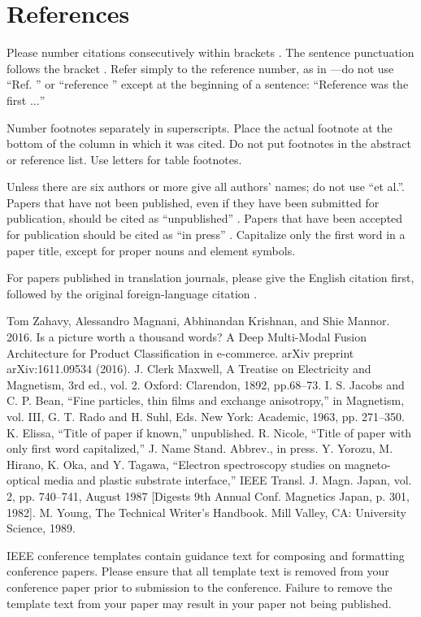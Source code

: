 \documentclass[conference]{IEEEtran}
\begin{document}
\section*{References}

Please number citations consecutively within brackets \cite{b1}. The 
sentence punctuation follows the bracket \cite{b2}. Refer simply to the reference 
number, as in \cite{b3}---do not use ``Ref. \cite{b3}'' or ``reference \cite{b3}'' except at 
the beginning of a sentence: ``Reference \cite{b3} was the first $\ldots$''

Number footnotes separately in superscripts. Place the actual footnote at 
the bottom of the column in which it was cited. Do not put footnotes in the 
abstract or reference list. Use letters for table footnotes.

Unless there are six authors or more give all authors' names; do not use 
``et al.''. Papers that have not been published, even if they have been 
submitted for publication, should be cited as ``unpublished'' \cite{b4}. Papers 
that have been accepted for publication should be cited as ``in press'' \cite{b5}. 
Capitalize only the first word in a paper title, except for proper nouns and 
element symbols.

For papers published in translation journals, please give the English 
citation first, followed by the original foreign-language citation \cite{b6}.

\begin{thebibliography}{00}
 Tom Zahavy, Alessandro Magnani, Abhinandan Krishnan, and Shie Mannor. 2016.
Is a picture worth a thousand words? A Deep Multi-Modal Fusion Architecture
for Product Classification in e-commerce. arXiv preprint arXiv:1611.09534 (2016).
 J. Clerk Maxwell, A Treatise on Electricity and Magnetism, 3rd ed., vol. 2. Oxford: Clarendon, 1892, pp.68--73.
 I. S. Jacobs and C. P. Bean, ``Fine particles, thin films and exchange anisotropy,'' in Magnetism, vol. III, G. T. Rado and H. Suhl, Eds. New York: Academic, 1963, pp. 271--350.
 K. Elissa, ``Title of paper if known,'' unpublished.
 R. Nicole, ``Title of paper with only first word capitalized,'' J. Name Stand. Abbrev., in press.
 Y. Yorozu, M. Hirano, K. Oka, and Y. Tagawa, ``Electron spectroscopy studies on magneto-optical media and plastic substrate interface,'' IEEE Transl. J. Magn. Japan, vol. 2, pp. 740--741, August 1987 [Digests 9th Annual Conf. Magnetics Japan, p. 301, 1982].
 M. Young, The Technical Writer's Handbook. Mill Valley, CA: University Science, 1989.
\end{thebibliography}
\vspace{12pt}
\color{red}
IEEE conference templates contain guidance text for composing and formatting conference papers. Please ensure that all template text is removed from your conference paper prior to submission to the conference. Failure to remove the template text from your paper may result in your paper not being published.
\end{document}
